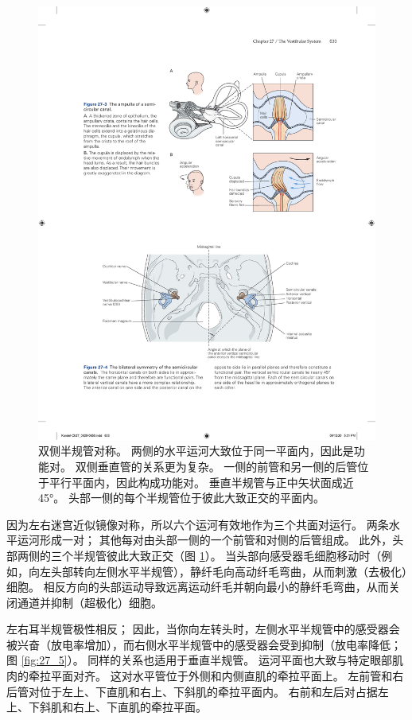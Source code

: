 \begin{figure}[htbp]
	\centering
	\includegraphics[width=0.75\linewidth]{chap27/fig_27_4}
	\caption{双侧半规管对称。 两侧的水平运河大致位于同一平面内，因此是功能对。 双侧垂直管的关系更为复杂。 一侧的前管和另一侧的后管位于平行平面内，因此构成功能对。 垂直半规管与正中矢状面成近 45°。 头部一侧的每个半规管位于彼此大致正交的平面内。}
	\label{fig:27_4}
\end{figure}

因为左右迷宫近似镜像对称，所以六个运河有效地作为三个共面对运行。 两条水平运河形成一对； 其他每对由头部一侧的一个前管和对侧的后管组成。 此外，头部两侧的三个半规管彼此大致正交（图 \ref{fig:27_4}）。 当头部向感受器毛细胞移动时（例如，向左头部转向左侧水平半规管），静纤毛向高动纤毛弯曲，从而刺激（去极化）细胞。 相反方向的头部运动导致远离运动纤毛并朝向最小的静纤毛弯曲，从而关闭通道并抑制（超极化）细胞。

左右耳半规管极性相反； 因此，当你向左转头时，左侧水平半规管中的感受器会被兴奋（放电率增加），而右侧水平半规管中的感受器会受到抑制（放电率降低；图 \ref{fig:27_5}）。 
同样的关系也适用于垂直半规管。 运河平面也大致与特定眼部肌肉的牵拉平面对齐。 这对水平管位于外侧和内侧直肌的牵拉平面上。 左前管和右后管对位于左上、下直肌和右上、下斜肌的牵拉平面内。 右前和左后对占据左上、下斜肌和右上、下直肌的牵拉平面。

